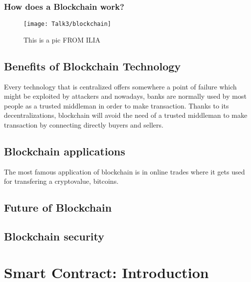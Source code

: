 \subsubsection{How does a Blockchain work?}
           \begin{figure}[ht]
         \begin{center}
         \texttt{[image: Talk3/blockchain]}
         \end{center}
         \caption{This is a pic FROM ILIA}
         \label{label}
       \end{figure}
   
\subsection{Benefits of Blockchain Technology}
Every technology that is centralized offers somewhere a point of failure which might be exploited by attackers and nowadays, banks are normally used by most people as a trusted middleman in order to make transaction.
Thanks to its decentralizations, blockchain will avoid the need of a trusted middleman to make transaction by connecting directly buyers and sellers.

\subsection{Blockchain applications}
The most famous application of blockchain is in online trades where it gets used for transfering a cryptovalue, bitcoins.


\subsection{Future of Blockchain}

\subsection{Blockchain security}


\section{Smart Contract: Introduction}
